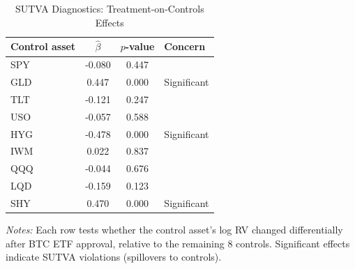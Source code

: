 \begin{table}[htbp]
  \centering
  \caption{SUTVA Diagnostics: Treatment-on-Controls Effects}\label{tab:sutva}
  \begin{threeparttable}
    \begin{tabular}{l S[table-format=-1.3] S[table-format=1.3] l}
      \toprule
      {Control asset} & {$\hat{\beta}$} & {$p$-value} & {Concern} \\
      \midrule
      SPY & -0.080 & 0.447 &  \\
      GLD & 0.447 & 0.000 & Significant \\
      TLT & -0.121 & 0.247 &  \\
      USO & -0.057 & 0.588 &  \\
      HYG & -0.478 & 0.000 & Significant \\
      IWM & 0.022 & 0.837 &  \\
      QQQ & -0.044 & 0.676 &  \\
      LQD & -0.159 & 0.123 &  \\
      SHY & 0.470 & 0.000 & Significant \\
      \bottomrule
    \end{tabular}
    \begin{tablenotes}[flushleft]
      \small
      \item \textit{Notes:} Each row tests whether the control asset's log RV changed
        differentially after BTC ETF approval, relative to the remaining 8 controls.
        Significant effects indicate SUTVA violations (spillovers to controls).
    \end{tablenotes}
  \end{threeparttable}
\end{table}
